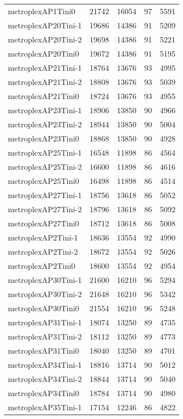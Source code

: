 \begin{longtable}{lrrrr}
metroplexAP1Tini0 & 21742 & 16054 & 97 & 5591 \\
metroplexAP20Tini-1 & 19686 & 14386 & 91 & 5209 \\
metroplexAP20Tini-2 & 19698 & 14386 & 91 & 5221 \\
metroplexAP20Tini0 & 19672 & 14386 & 91 & 5195 \\
metroplexAP21Tini-1 & 18764 & 13676 & 93 & 4995 \\
metroplexAP21Tini-2 & 18808 & 13676 & 93 & 5039 \\
metroplexAP21Tini0 & 18724 & 13676 & 93 & 4955 \\
metroplexAP23Tini-1 & 18906 & 13850 & 90 & 4966 \\
metroplexAP23Tini-2 & 18944 & 13850 & 90 & 5004 \\
metroplexAP23Tini0 & 18868 & 13850 & 90 & 4928 \\
metroplexAP25Tini-1 & 16548 & 11898 & 86 & 4564 \\
metroplexAP25Tini-2 & 16600 & 11898 & 86 & 4616 \\
metroplexAP25Tini0 & 16498 & 11898 & 86 & 4514 \\
metroplexAP27Tini-1 & 18756 & 13618 & 86 & 5052 \\
metroplexAP27Tini-2 & 18796 & 13618 & 86 & 5092 \\
metroplexAP27Tini0 & 18712 & 13618 & 86 & 5008 \\
metroplexAP2Tini-1 & 18636 & 13554 & 92 & 4990 \\
metroplexAP2Tini-2 & 18672 & 13554 & 92 & 5026 \\
metroplexAP2Tini0 & 18600 & 13554 & 92 & 4954 \\
metroplexAP30Tini-1 & 21600 & 16210 & 96 & 5294 \\
metroplexAP30Tini-2 & 21648 & 16210 & 96 & 5342 \\
metroplexAP30Tini0 & 21554 & 16210 & 96 & 5248 \\
metroplexAP31Tini-1 & 18074 & 13250 & 89 & 4735 \\
metroplexAP31Tini-2 & 18112 & 13250 & 89 & 4773 \\
metroplexAP31Tini0 & 18040 & 13250 & 89 & 4701 \\
metroplexAP34Tini-1 & 18816 & 13714 & 90 & 5012 \\
metroplexAP34Tini-2 & 18844 & 13714 & 90 & 5040 \\
metroplexAP34Tini0 & 18784 & 13714 & 90 & 4980 \\
metroplexAP35Tini-1 & 17154 & 12246 & 86 & 4822 \\

\end{longtable}
